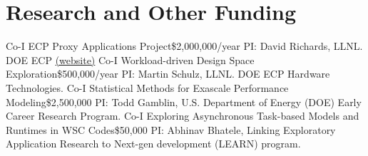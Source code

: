 \section{Research and Other Funding}
		{Co-I}
		{ECP Proxy Applications Project}{}{\$2,000,000/year}
		{PI: David Richards, LLNL. DOE ECP
    \href{https://exascaleproject.github.io/proxy-apps}{(website)}}
		{Co-I}
		{Workload-driven Design Space Exploration}{}{\$500,000/year}
		{PI: Martin Schulz, LLNL. DOE ECP Hardware Technologies.}
		{Co-I}
		{Statistical Methods for Exascale Performance Modeling}{}{\$2,500,000}
    {PI: Todd Gamblin, U.S. Department of Energy (DOE) Early Career Research Program.}
		{Co-I}
		{Exploring Asynchronous Task-based Models and Runtimes in WSC Codes}{}{\$50,000}
    {PI: Abhinav Bhatele, Linking Exploratory Application Research to Next-gen development (LEARN) program.}

